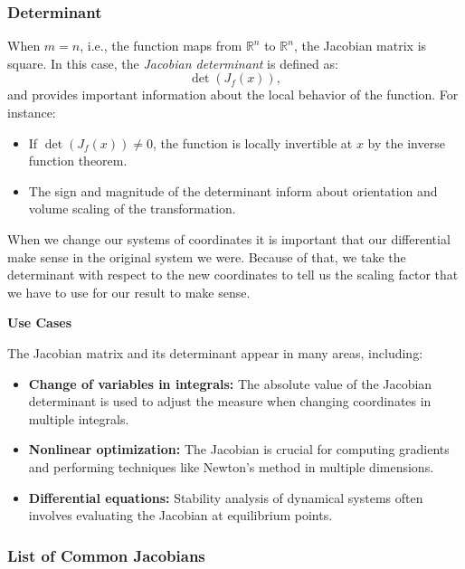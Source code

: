 \subsubsection{Determinant}
When \(m = n\), i.e., the function maps from 
\(\mathbb{R}^n\) to \(\mathbb{R}^n\), 
the Jacobian matrix is square. In this case, 
the \emph{Jacobian determinant} is defined as:
\[
\det(J_{f}(x)),
\]
and provides important information about the local behavior of the function. For instance:
\begin{itemize}[label=\(-\)]
  \item If \(\det(J_{f}(x)) \neq 0\), the function is locally invertible at \(x\) by the inverse 
  function theorem.
  \item The sign and magnitude of the determinant 
  inform about orientation and volume scaling of the transformation.
\end{itemize}

When we change our systems of coordinates it is important
that our differential make sense in the original system we were.
Because of that, we take the determinant with respect to the new
coordinates to tell us the scaling factor that we have to use for our
result to make sense.
\vspace{\baselineskip}

\textbf{Use Cases}
\vspace{\baselineskip}

The Jacobian matrix and its determinant appear in many areas, including:
\begin{itemize}[label=\(-\)]
  \item \textbf{Change of variables in integrals:} The absolute value of the Jacobian determinant is used to adjust the measure when changing coordinates in multiple integrals.
  \item \textbf{Nonlinear optimization:} The Jacobian is crucial for computing gradients and performing techniques like Newton's method in multiple dimensions.
  \item \textbf{Differential equations:} Stability analysis of dynamical systems often involves evaluating the Jacobian at equilibrium points.
\end{itemize}

\subsubsection{List of Common Jacobians}


